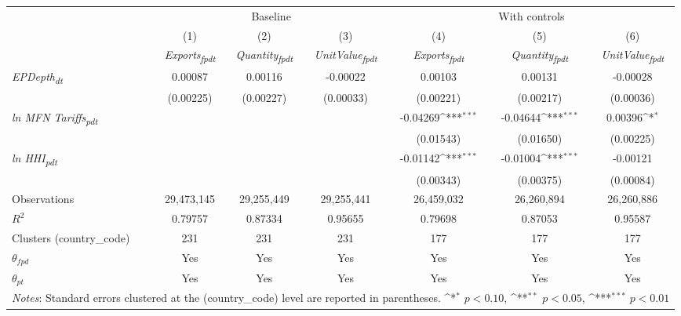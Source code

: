{
\def\sym#1{\ifmmode^{#1}\else\(^{#1}\)\fi}
\begin{tabular}{l*{6}{c}}
\toprule
&\multicolumn{3}{c}{Baseline}&\multicolumn{3}{c}{With controls}\\\cmidrule(lr){2-4}\cmidrule(lr){5-7}
&(1)&(2)&(3)&(4)&(5)&(6)\\
&\textit{Exports\textsubscript{fpdt}}&\textit{Quantity\textsubscript{fpdt}}&\textit{UnitValue\textsubscript{fpdt}}&\textit{Exports\textsubscript{fpdt}}&\textit{Quantity\textsubscript{fpdt}}&\textit{UnitValue\textsubscript{fpdt}}\\
\midrule
\textit{EPDepth\textsubscript{dt}} & 0.00087 & 0.00116 & -0.00022 & 0.00103 & 0.00131 & -0.00028\\
 & (0.00225) & (0.00227) & (0.00033) & (0.00221) & (0.00217) & (0.00036)\\
\addlinespace
\textit{ln MFN Tariffs\textsubscript{pdt}} &  &  &  & -0.04269\sym{***} & -0.04644\sym{***} & 0.00396\sym{*}\\
 &  &  &  & (0.01543) & (0.01650) & (0.00225)\\
\addlinespace
\textit{ln HHI\textsubscript{pdt}} &  &  &  & -0.01142\sym{***} & -0.01004\sym{***} & -0.00121\\
 &  &  &  & (0.00343) & (0.00375) & (0.00084)\\
\midrule
Observations & 29,473,145 & 29,255,449 & 29,255,441 & 26,459,032 & 26,260,894 & 26,260,886\\
$R^{2}$ & 0.79757 & 0.87334 & 0.95655 & 0.79698 & 0.87053 & 0.95587\\
Clusters (country_code) & 231 & 231 & 231 & 177 & 177 & 177\\
$\theta_{fpd}$ & Yes & Yes & Yes & Yes & Yes & Yes\\
$\theta_{pt}$ & Yes & Yes & Yes & Yes & Yes & Yes\\
\bottomrule
\multicolumn{7}{l}{\footnotesize \textit{Notes}: Standard errors clustered at the (country_code) level are reported in parentheses. \sym{*} \(p<0.10\), \sym{**} \(p<0.05\), \sym{***} \(p<0.01\)}\\
\end{tabular}
}
